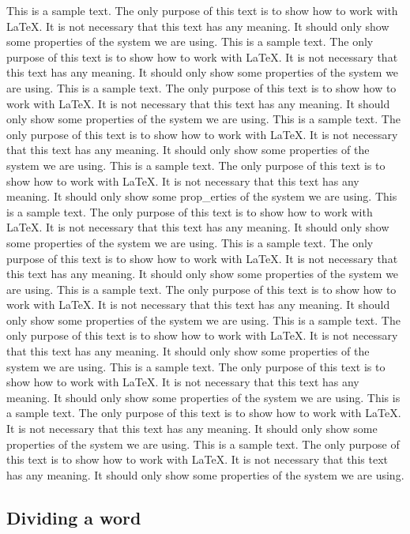 \documentclass[10pt, paper=a4, abstracton]{scrartcl}
\begin{document}
This is a sample text. The only purpose of this text is to show how to work with \LaTeX . It is not necessary that this text has any meaning. It should only show some properties of the system we are using. This is a sample text. The only purpose of this text is to show how to work with \LaTeX . It is not necessary that this text has any meaning. It should only show some properties of the system we are using. This is a sample text. The only purpose of this text is to show how to work with \LaTeX . It is not necessary that this text has any meaning. It should only show some properties of the system we are using. This is a sample text. The only purpose of this text is to show how to work with \LaTeX . It is not necessary that this text has any meaning. It should only show some properties of the system we are using. This is a sample text. The only purpose of this text is to show how to work with \LaTeX . It is not necessary that this text has any meaning. It should only show some prop\_erties of the system we are using. This is a sample text. The only purpose of this text is to show how to work with \LaTeX . It is not necessary that this text has any meaning. It should only show some properties of the system we are using. This is a sample text. The only purpose of this text is to show how to work with \LaTeX . It is not necessary that this text has any meaning. It should only show some properties of the system we are using. This is a sample text. The only purpose of this text is to show how to work with \LaTeX . It is not necessary that this text has any meaning. It should only show some properties of the system we are using. This is a sample text. The only purpose of this text is to show how to work with \LaTeX . It is not necessary that this text has any meaning. It should only show some properties of the system we are using. This is a sample text. The only purpose of this text is to show how to work with \LaTeX . It is not necessary that this text has any meaning. It should only show some properties of the system we are using. This is a sample text. The only purpose of this text is to show how to work with \LaTeX . It is not necessary that this text has any meaning. It should only show some properties of the system we are using. This is a sample text. The only purpose of this text is to show how to work with \LaTeX . It is not necessary that this text has any meaning. It should only show some properties of the system we are using. 


\subsection{Dividing a word}
\end{document}
